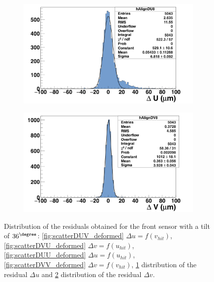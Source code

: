 \begin{figure}[!h]
        \begin{subfigure}[t]{0.45\textwidth}
          \centering
          \includegraphics[width = 1.2\textwidth]{Pictures/deformation/deltaU_8_deformed.png}
          \caption{}
          \label{fig:residualUDef}
        \end{subfigure}
        \hfill
        \begin{subfigure}[t]{0.45\textwidth}
          \centering
          \includegraphics[width = 1.2\textwidth]{Pictures/deformation/deltaV_8_deformed.png}
          \caption{}
          \label{fig:residualVDef}
        \end{subfigure}
        \caption{Distribution of the residuals obtained for the front sensor with a tilt of $36^{\degree}$: \ref{fig:scatterDUV_deformed} $\Delta u = f(v_{hit})$, 
        \ref{fig:scatterDVU_deformed} $\Delta v = f(u_{hit})$, \ref{fig:scatterDUU_deformed} $\Delta u = f(u_{hit})$,
        \ref{fig:scatterDVV_deformed} $\Delta v = f(v_{hit})$, \ref{fig:residualUDef} distribution of the residual $\Delta u$ and \ref{fig:residualVDef} distribution of the residual $\Delta v$.
        }
        \label{fig:alignmentPlane8Deformed}
      \end{figure}

